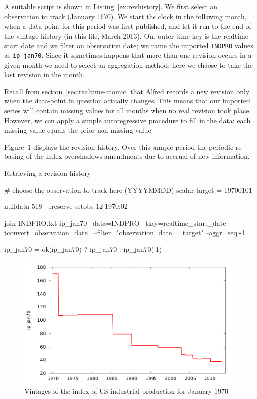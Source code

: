 A suitable script is shown in Listing~\ref{ex:revhistory}.  We first
select an observation to track (January 1970). We start the clock in
the following month, when a data-point for this period was first
published, and let it run to the end of the vintage history (in this
file, March 2013).  Our outer time key is the realtime start date and
we filter on observation date; we name the imported \texttt{INDPRO}
values as \texttt{ip\_jan70}. Since it sometimes happens that more
than one revision occurs in a given month we need to select an
aggregation method: here we choose to take the last revision in the
month.

Recall from section~\ref{sec:realtime-atomic} that Alfred records a
new revision only when the data-point in question actually
changes. This means that our imported series will contain missing
values for all months when no real revision took place. However, we
can apply a simple autoregressive procedure to fill in the data: each
missing value equals the prior non-missing value.

Figure~\ref{fig:realtime-revhist} displays the revision history. Over
this sample period the periodic re-basing of the index overshadows
amendments due to accrual of new information.

\begin{script}[htbp]
  \caption{Retrieving a revision history}
  \label{ex:revhistory}
\begin{scode}
# choose the observation to track here (YYYYMMDD)
scalar target = 19700101

nulldata 518 --preserve
setobs 12 1970:02

join INDPRO.txt ip_jan70 --data=INDPRO --tkey=realtime_start_date \
--tconvert=observation_date \
--filter="observation_date==target" --aggr=seq:-1

ip_jan70 = ok(ip_jan70) ? ip_jan70 : ip_jan70(-1)
\end{scode}
\end{script}

\begin{figure}[htbp]
  \centering
\includegraphics[scale=0.75]{figures/revhist}
\caption{Vintages of the index of US industrial production for January
  1970}
  \label{fig:realtime-revhist}
\end{figure}

    
